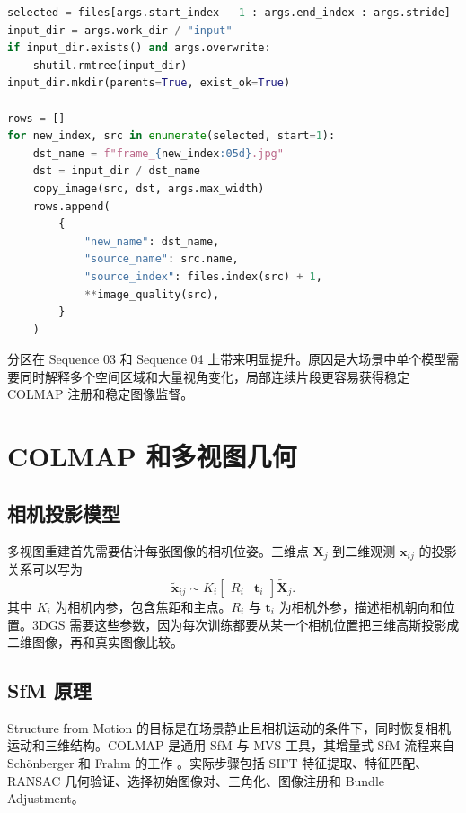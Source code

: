 \documentclass[UTF8,a4paper,11pt]{ctexart}
\begin{document}
\begin{lstlisting}[language=Python,caption={连续片段分区}]
selected = files[args.start_index - 1 : args.end_index : args.stride]
input_dir = args.work_dir / "input"
if input_dir.exists() and args.overwrite:
    shutil.rmtree(input_dir)
input_dir.mkdir(parents=True, exist_ok=True)

rows = []
for new_index, src in enumerate(selected, start=1):
    dst_name = f"frame_{new_index:05d}.jpg"
    dst = input_dir / dst_name
    copy_image(src, dst, args.max_width)
    rows.append(
        {
            "new_name": dst_name,
            "source_name": src.name,
            "source_index": files.index(src) + 1,
            **image_quality(src),
        }
    )
\end{lstlisting}

分区在 Sequence 03 和 Sequence 04 上带来明显提升。原因是大场景中单个模型需要同时解释多个空间区域和大量视角变化，局部连续片段更容易获得稳定 COLMAP 注册和稳定图像监督。

\section{COLMAP 和多视图几何}

\subsection{相机投影模型}

多视图重建首先需要估计每张图像的相机位姿。三维点 \(\mathbf{X}_j\) 到二维观测 \(\mathbf{x}_{ij}\) 的投影关系可以写为
\[
\tilde{\mathbf{x}}_{ij} \sim K_i
\begin{bmatrix}
R_i & \mathbf{t}_i
\end{bmatrix}
\tilde{\mathbf{X}}_j .
\]
其中 \(K_i\) 为相机内参，包含焦距和主点。\(R_i\) 与 \(\mathbf{t}_i\) 为相机外参，描述相机朝向和位置。3DGS 需要这些参数，因为每次训练都要从某一个相机位置把三维高斯投影成二维图像，再和真实图像比较。

\subsection{SfM 原理}

Structure from Motion 的目标是在场景静止且相机运动的条件下，同时恢复相机运动和三维结构。COLMAP 是通用 SfM 与 MVS 工具，其增量式 SfM 流程来自 Schönberger 和 Frahm 的工作 \cite{schonberger2016,colmapdocs}。实际步骤包括 SIFT 特征提取、特征匹配、RANSAC 几何验证、选择初始图像对、三角化、图像注册和 Bundle Adjustment。
\end{document}
